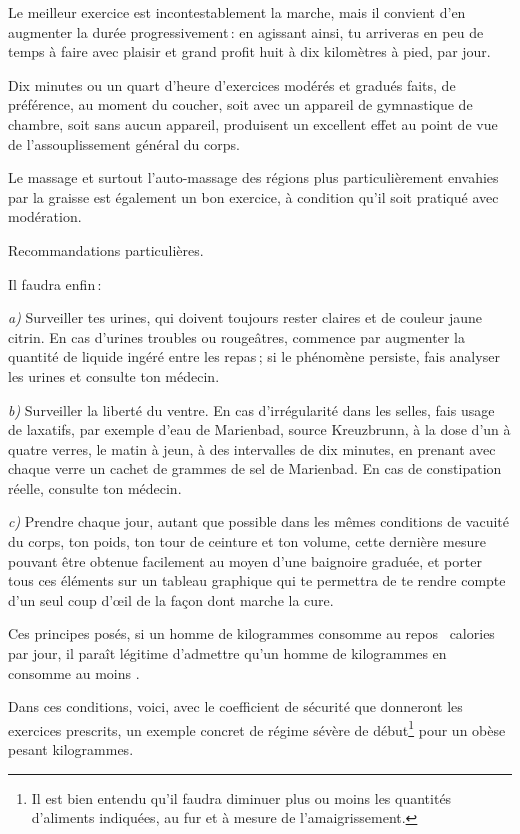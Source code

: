 Le meilleur exercice est incontestablement la marche, mais il convient d'en
augmenter la durée progressivement : en agissant ainsi, tu arriveras en peu de
temps à faire avec plaisir et grand profit huit à dix kilomètres à pied, par
jour.

Dix minutes ou un quart d'heure d'exercices modérés et gradués faits, de
préférence, au moment du coucher, soit avec un appareil de gymnastique de
chambre, soit sans aucun appareil, produisent un excellent effet au point de vue
de l’assouplissement général du corps.

Le massage et surtout l’auto-massage des régions plus particulièrement envahies
par la graisse est également un bon exercice, à condition qu'il soit pratiqué avec
modération.

\begin{center}
\sc
Recommandations particulières.
\end{center}

Il faudra enfin :

\textit{a)} Surveiller tes urines, qui doivent toujours rester claires et de
couleur jaune citrin. En cas d'urines troubles ou rougeâtres, commence par
augmenter la quantité de liquide ingéré entre les repas ; si le phénomène
persiste, fais analyser les urines et consulte ton médecin.

\textit{b)} Surveiller la liberté du ventre. En cas d'irrégularité dans les
selles, fais usage de laxatifs, par exemple d'eau de Marienbad, source
Kreuzbrunn, à la dose d'un à quatre verres, le matin à jeun, à des intervalles
de dix minutes, en prenant avec chaque verre un cachet de {\mmm} grammes
de sel de Marienbad. En cas de constipation réelle, consulte ton médecin.

\textit{c)} Prendre chaque jour, autant que possible dans les mêmes conditions de
vacuité du corps, ton poids, ton tour de ceinture et ton volume, cette dernière
mesure pouvant être obtenue facilement au moyen d'une baignoire graduée, et
porter tous ces éléments sur un tableau graphique qui te permettra de te rendre
compte d'un seul coup d'œil de la façon dont marche la cure.

Ces principes posés, si un homme de {\mmm} kilogrammes consomme au repos
{\mmm} {\mmm} calories par jour, il paraît légitime d'admettre
qu'un homme de {\mmm} kilogrammes en consomme au moins {\mmm}.

Dans ces conditions, voici, avec le coefficient de sécurité que donneront les
exercices prescrits, un exemple concret de régime sévère de début\footnote{Il
est bien entendu qu'il faudra diminuer plus ou moins les quantités d'aliments
indiquées, au fur et à mesure de l'amaigrissement.} pour un obèse pesant
{\mmm} kilogrammes.

